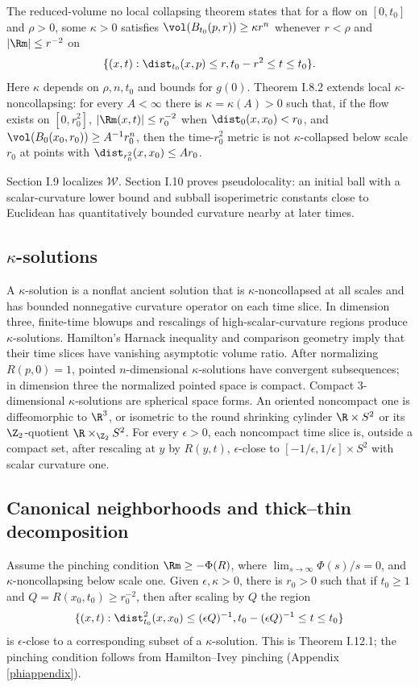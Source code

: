 The reduced-volume no local collapsing theorem states that for a flow on
$[0,t_0]$ and $\rho>0$, some $\kappa>0$ satisfies
$\vol(B_{t_0}(p,r))\geq\kappa r^n$ whenever $r<\rho$ and
$|\Rm|\leq r^{-2}$ on
\[
\{(x,t):\dist_{t_0}(x,p)\leq r, t_0-r^2\leq t\leq t_0\}.
\]
Here $\kappa$ depends on $\rho,n,t_0$ and bounds for $g(0)$.  Theorem
I.8.2 extends local $\kappa$-noncollapsing: for every $A<\infty$ there is
$\kappa=\kappa(A)>0$ such that, if the flow exists on $[0,r_0^2]$,
$|\Rm(x,t)|\leq r_0^{-2}$ when $\dist_0(x,x_0)<r_0$, and
$\vol(B_0(x_0,r_0))\geq A^{-1}r_0^n$, then the time-$r_0^2$ metric is not
$\kappa$-collapsed below scale $r_0$ at points with
$\dist_{r_0^2}(x,x_0)\leq Ar_0$.

Section I.9 localizes ${\mathcal W}$.  Section I.10 proves pseudolocality:
an initial ball with a scalar-curvature lower bound and subball isoperimetric
constants close to Euclidean has quantitatively bounded curvature nearby at
later times.

\subsection{$\kappa$-solutions}

A $\kappa$-solution is a nonflat ancient solution that is
$\kappa$-noncollapsed at all scales and has bounded nonnegative curvature
operator on each time slice.  In dimension three, finite-time blowups and
rescalings of high-scalar-curvature regions produce $\kappa$-solutions.
Hamilton's Harnack inequality and comparison geometry imply that their time
slices have vanishing asymptotic volume ratio.  After normalizing
$R(p,0)=1$, pointed $n$-dimensional $\kappa$-solutions have convergent
subsequences; in dimension three the normalized pointed space is compact.
Compact $3$-dimensional $\kappa$-solutions are spherical space forms.  An
oriented noncompact one is diffeomorphic to $\R^3$, or isometric to the round
shrinking cylinder $\R\times S^2$ or its $\Z_2$-quotient
$\R\times_{\Z_2}S^2$.  For every $\epsilon>0$, each noncompact time slice is,
outside a compact set, after rescaling at $y$ by $R(y,t)$,
$\epsilon$-close to
$[-1/\epsilon,1/\epsilon]\times S^2$ with scalar curvature one.

\subsection{Canonical neighborhoods and thick--thin decomposition}

Assume the pinching condition
$\Rm\geq-\Phi(R)$, where
$\lim_{s\rightarrow\infty}\Phi(s)/s=0$, and $\kappa$-noncollapsing below
scale one.  Given $\epsilon,\kappa>0$, there is $r_0>0$ such that if
$t_0\geq1$ and $Q=R(x_0,t_0)\geq r_0^{-2}$, then after scaling by $Q$ the
region
\[
\{(x,t):\dist_{t_0}^2(x,x_0)\leq(\epsilon Q)^{-1},
t_0-(\epsilon Q)^{-1}\leq t\leq t_0\}
\]
is $\epsilon$-close to a corresponding subset of a $\kappa$-solution.  This
is Theorem I.12.1; the pinching condition follows from Hamilton--Ivey
pinching (Appendix \ref{phiappendix}).

